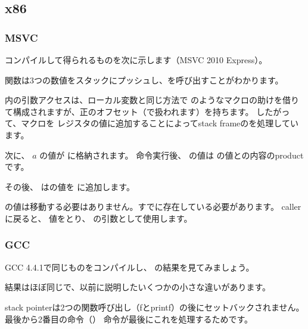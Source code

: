 \subsection{x86}

\subsubsection{MSVC}

コンパイルして得られるものを次に示します（MSVC 2010 Express）。




\main 関数は3つの数値をスタックにプッシュし、を呼び出すことがわかります。

\ttf 内の引数アクセスは、ローカル変数と同じ方法で
のようなマクロの助けを借りて構成されますが、正のオフセット（で扱われます）を持ちます。 
したがって、マクロを \EBP レジスタの値に追加することによって\gls{stack frame}のを処理しています。


次に、 $a$ の値が \EAX に格納されます。 \IMUL 命令実行後、 
\EAX の値は \EAX の値との内容の\gls{product}です。

その後、 \ADD はの値を \EAX に追加します。

\EAX の値は移動する必要はありません。すでに存在している必要があります。 
\gls{caller}に戻ると、 \EAX 値をとり、 \printf の引数として使用します。



\subsubsection{GCC}

GCC 4.4.1で同じものをコンパイルし、 \IDA の結果を見てみましょう。



結果はほぼ同じで、以前に説明したいくつかの小さな違いがあります。

\gls{stack pointer}は2つの関数呼び出し（fとprintf）の後にセットバックされません。
最後から2番目の命令（）
命令が最後にこれを処理するためです。
